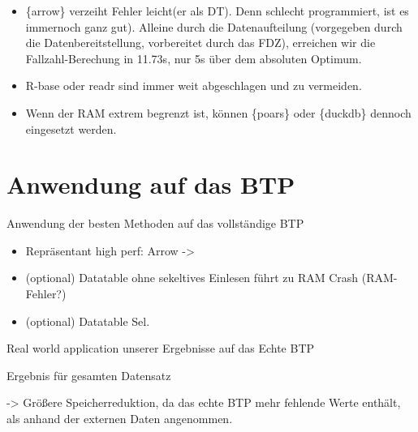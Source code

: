 \documentclass[
  german,
  10pt,
  twoside]{article}
\providecommand{\tightlist}{%
  \setlength{\itemsep}{0pt}\setlength{\parskip}{0pt}}
\begin{document}
\begin{itemize}
  \begin{itemize}
  \tightlist
  \item
    5x langsamer als \{arrow\}
  \item
    Variablenauswahl ab einer gewissen Datenmenge erforderlich, da ohne
    3x größer als die Eingangsdaten, dauert 2.2 min anstatt 23 Sec.
    -\textgreater{} schwierige Anwendung (Entscheidung relevanter
    Variablen muss vorab getroffen werden unter Beachtung der
    Arbeitsspeicher Restriktionen)
  \item
    Datenaufteilung verschlechtert DT im Gegensatz zu arrow
  \end{itemize}
\item
  \{arrow\} verzeiht Fehler leicht(er als DT). Denn schlecht
  programmiert, ist es immernoch ganz gut). Alleine durch die
  Datenaufteilung (vorgegeben durch die Datenbereitstellung, vorbereitet
  durch das FDZ), erreichen wir die Fallzahl-Berechung in 11.73s, nur 5s
  über dem absoluten Optimum.
\item
  R-base oder readr sind immer weit abgeschlagen und zu vermeiden.
\item
  Wenn der RAM extrem begrenzt ist, können \{poars\} oder \{duckdb\}
  dennoch eingesetzt werden.
\end{itemize}

\setcounter{subsection}{4}

\section{Anwendung auf das BTP}\label{sec-ergebnis}

Anwendung der besten Methoden auf das vollständige BTP

\begin{itemize}
\tightlist
\item
  Repräsentant high perf: Arrow -\textgreater{}
\item
  (optional) Datatable ohne sekeltives Einlesen führt zu RAM Crash
  (RAM-Fehler?)
\item
  (optional) Datatable Sel.
\end{itemize}

Real world application unserer Ergebnisse auf das Echte BTP

Ergebnis für gesamten Datensatz

-\textgreater{} Größere Speicherreduktion, da das echte BTP mehr
fehlende Werte enthält, als anhand der externen Daten angenommen.

\setcounter{subsection}{5}
\end{document}
